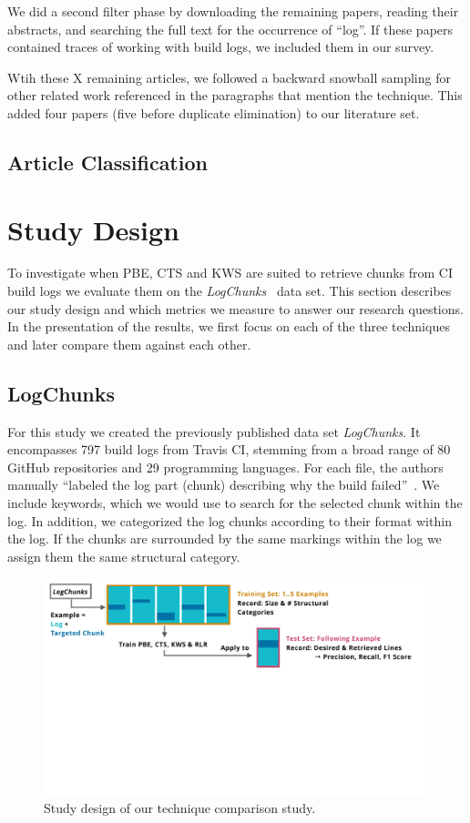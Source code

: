 We did a second filter phase by downloading the remaining papers,
reading their abstracts, and searching the full text for the
occurrence of ``log''. If these papers contained traces of working
with build logs, we included them in our survey.

Wtih these X remaining articles, we followed a backward snowball
sampling for other related work referenced in the paragraphs that
mention the technique. This added four papers (five before duplicate
elimination) to our literature set.

\subsection{Article Classification}

\section{Study Design}
\label{sec:study}
To investigate when PBE, CTS and KWS are suited to retrieve chunks from CI build
logs we evaluate them on the \emph{LogChunks}~\cite{brandt2020logchunks} data set.
This section describes our study design and which metrics we measure to answer our research questions.
In the presentation of the results, we first focus on each of the three techniques and later compare them against each other.

\subsection{LogChunks}
For this study we created the previously published data set \emph{LogChunks}.
It encompasses 797 build logs from Travis CI, stemming from a broad range of 80
GitHub repositories and 29 programming languages. For each file, the authors
manually ``labeled the log part (chunk) describing why the build failed''~\cite{brandt2020logchunks}.
We include keywords, which we would use to search for the selected chunk
within the log. In addition, we categorized the log chunks according to their
format within the log. If the chunks are surrounded by the same markings within
the log we assign them the same structural category.

\begin{figure}[!t]
	\centering
	\includegraphics[width=\textwidth, trim={0.4cm 8.4cm 1.2cm 0.3cm}, clip]{img/study.pdf}
	\caption{Study design of our technique comparison study.}
	\label{fig:study}
\end{figure}


